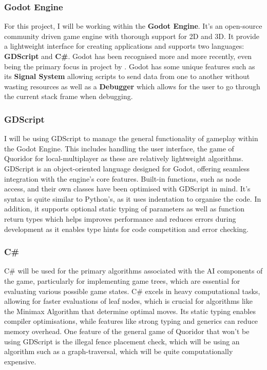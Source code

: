 \documentclass[review]{cmpreport}
\begin{document}
\subsubsection{Godot Engine}
For this project, I will be working within the \textbf{Godot Engine}. It's an open-source community driven game engine with thorough support for 2D and 3D. It provide a lightweight interface for creating applications and supports two languages: \textbf{GDScript} and \textbf{C\#}. Godot has been recognised more and more recently, even being the primary focus in project by \cite{salmela2022game}. Godot has some unique features such as its \textbf{Signal System} allowing scripts to send data from one to another without wasting resources as well as a \textbf{Debugger} which allows for the user to go through the current stack frame when debugging.

\subsubsection{GDScript}
I will be using GDScript to manage the general functionality of gameplay within the Godot Engine. This includes handling the user interface, the game of Quoridor for local-multiplayer as these are relatively lightweight algorithms. GDScript is an object-oriented language designed for Godot, offering seamless integration with the engine's core features. Built-in functions, such as node access, and their own classes have been optimised with GDScript in mind. It's syntax is quite similar to Python's, as it uses indentation to organise the code. In addition, it supports optional static typing of parameters as well as function return types which helps improves performance and reduces errors during development as it enables type hints for code competition and error checking.

\subsubsection{C\#}
C\# will be used for the primary algorithms associated with the AI components of the game, particularly for implementing game trees, which are essential for evaluating various possible game states. C\# excels in heavy computational tasks, allowing for faster evaluations of leaf nodes, which is crucial for algorithms like the Minimax Algorithm that determine optimal moves. Its static typing enables compiler optimisations, while features like strong typing and generics can reduce memory overhead. One feature of the general game of Quoridor that won't be using GDScript is the illegal fence placement check, which will be using an algorithm such as a graph-traversal, which will be quite computationally expensive.
\end{document}

